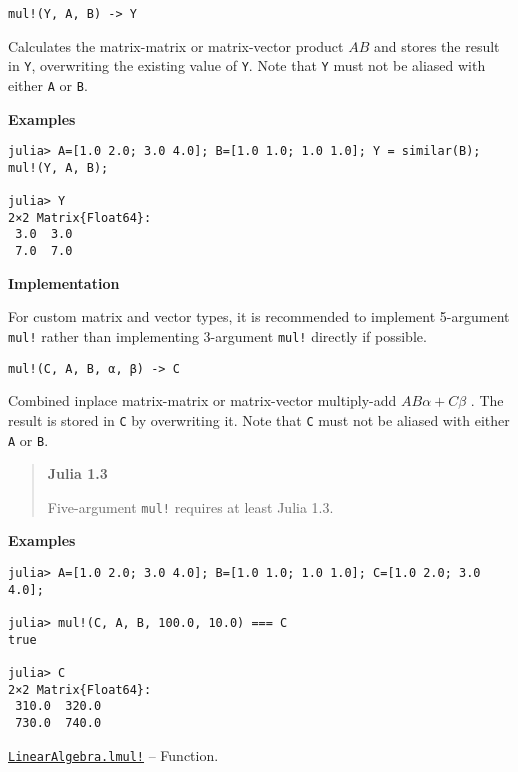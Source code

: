 \begin{adjustwidth}{2em}{0pt}


\begin{verbatim}
mul!(Y, A, B) -> Y
\end{verbatim}

Calculates the matrix-matrix or matrix-vector product  \(AB\)  and stores the result in \texttt{Y}, overwriting the existing value of \texttt{Y}. Note that \texttt{Y} must not be aliased with either \texttt{A} or \texttt{B}.

\textbf{Examples}


\begin{verbatim}
julia> A=[1.0 2.0; 3.0 4.0]; B=[1.0 1.0; 1.0 1.0]; Y = similar(B); mul!(Y, A, B);

julia> Y
2×2 Matrix{Float64}:
 3.0  3.0
 7.0  7.0
\end{verbatim}

\textbf{Implementation}

For custom matrix and vector types, it is recommended to implement 5-argument \texttt{mul!} rather than implementing 3-argument \texttt{mul!} directly if possible.




\begin{lstlisting}
mul!(C, A, B, α, β) -> C
\end{lstlisting}

Combined inplace matrix-matrix or matrix-vector multiply-add  \(A B α + C β\) . The result is stored in \texttt{C} by overwriting it.  Note that \texttt{C} must not be aliased with either \texttt{A} or \texttt{B}.

\begin{quote}
\textbf{Julia 1.3}

Five-argument \texttt{mul!} requires at least Julia 1.3.

\end{quote}
\textbf{Examples}


\begin{verbatim}
julia> A=[1.0 2.0; 3.0 4.0]; B=[1.0 1.0; 1.0 1.0]; C=[1.0 2.0; 3.0 4.0];

julia> mul!(C, A, B, 100.0, 10.0) === C
true

julia> C
2×2 Matrix{Float64}:
 310.0  320.0
 730.0  740.0
\end{verbatim}



\end{adjustwidth}
\hypertarget{12404459690324241452}{}
\hyperlink{12404459690324241452}{\texttt{LinearAlgebra.lmul!}}  -- {Function.}

